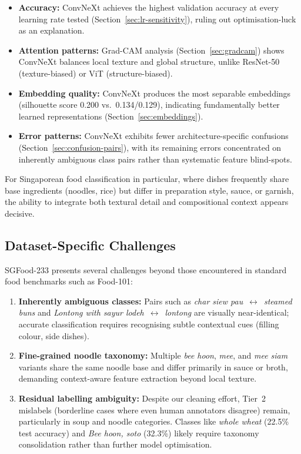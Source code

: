 \begin{itemize}
  \item \textbf{Accuracy:} ConvNeXt achieves the highest validation
    accuracy at every learning rate tested
    (Section~\ref{sec:lr-sensitivity}), ruling out optimisation-luck
    as an explanation.
  \item \textbf{Attention patterns:} Grad-CAM analysis
    (Section~\ref{sec:gradcam}) shows ConvNeXt balances local texture
    and global structure, unlike ResNet-50 (texture-biased) or ViT
    (structure-biased).
  \item \textbf{Embedding quality:} ConvNeXt produces the most
    separable embeddings (silhouette score 0.200 vs.\ 0.134/0.129),
    indicating fundamentally better learned representations
    (Section~\ref{sec:embeddings}).
  \item \textbf{Error patterns:} ConvNeXt exhibits fewer
    architecture-specific confusions (Section~\ref{sec:confusion-pairs}),
    with its remaining errors concentrated on inherently ambiguous class
    pairs rather than systematic feature blind-spots.
\end{itemize}

For Singaporean food classification in particular, where dishes
frequently share base ingredients (noodles, rice) but differ in
preparation style, sauce, or garnish, the ability to integrate both
textural detail and compositional context appears decisive.

\subsection{Dataset-Specific Challenges}\label{sec:dataset-challenges}

SGFood-233 presents several challenges beyond those encountered in
standard food benchmarks such as Food-101:

\begin{enumerate}
  \item \textbf{Inherently ambiguous classes:} Pairs such as
    \emph{char siew pau}~$\leftrightarrow$~\emph{steamed buns} and
    \emph{Lontong with sayur lodeh}~$\leftrightarrow$~\emph{lontong}
    are visually near-identical; accurate classification requires
    recognising subtle contextual cues (filling colour, side dishes).
  \item \textbf{Fine-grained noodle taxonomy:} Multiple \emph{bee hoon},
    \emph{mee}, and \emph{mee siam} variants share the same noodle base
    and differ primarily in sauce or broth, demanding
    context-aware feature extraction beyond local texture.
  \item \textbf{Residual labelling ambiguity:} Despite our cleaning
    effort, Tier~2 mislabels (borderline cases where even human
    annotators disagree) remain, particularly in soup and noodle
    categories.  Classes like \emph{whole wheat} (22.5\% test accuracy)
    and \emph{Bee hoon, soto} (32.3\%) likely require taxonomy
    consolidation rather than further model optimisation.
\end{enumerate}

